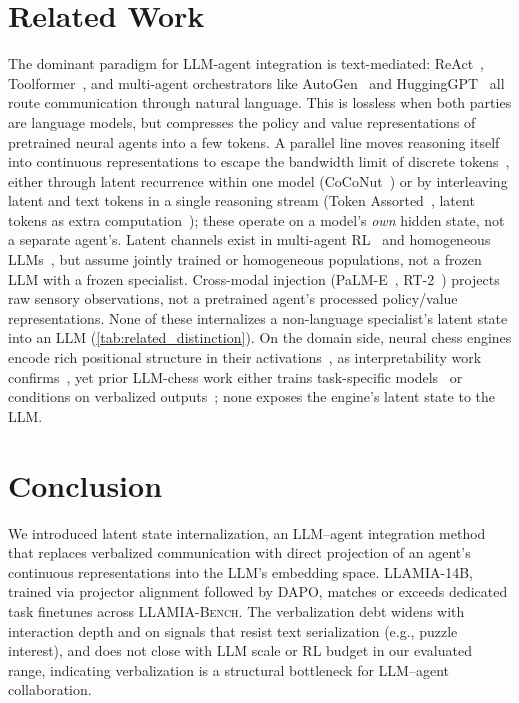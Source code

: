\section{Related Work}
\vspace{-2mm}
The dominant paradigm for LLM-agent integration is text-mediated: ReAct~\cite{yao2022react}, Toolformer~\cite{schick2023toolformerlanguagemodelsteach}, and multi-agent orchestrators like AutoGen~\cite{wu2023autogen} and HuggingGPT~\cite{shen2024hugginggpt} all route communication through natural language. This is lossless when both parties are language models, but compresses the policy and value representations of pretrained neural agents into a few tokens. A parallel line moves reasoning itself into continuous representations to escape the bandwidth limit of discrete tokens~\cite{zhu2025surveylatentreasoning}, either through latent recurrence within one model (CoCoNut~\cite{hao2025traininglargelanguagemodels}) or by interleaving latent and text tokens in a single reasoning stream (Token Assorted~\cite{su2025tokenassorted}, latent tokens as extra computation~\cite{sun2025latenttokens}); these operate on a model's \emph{own} hidden state, not a separate agent's. Latent channels exist in multi-agent RL~\cite{sukhbaatar2016learningmultiagentcommunicationbackpropagation,das2019tarmac,foerster2016learning} and homogeneous LLMs~\cite{latentmas2025}, but assume jointly trained or homogeneous populations, not a frozen LLM with a frozen specialist. Cross-modal injection (PaLM-E~\cite{driess2023palmeembodiedmultimodallanguage}, RT-2~\cite{brohan2023rt2visionlanguageactionmodelstransfer}) projects raw sensory observations, not a pretrained agent's processed policy/value representations. None of these internalizes a non-language specialist's latent state into an LLM (\cref{tab:related_distinction}). On the domain side, neural chess engines encode rich positional structure in their activations~\cite{silver2017mastering,monroe2024mastering}, as interpretability work confirms~\cite{jenner2024evidence}, yet prior LLM-chess work either trains task-specific models~\cite{jhamtani-etal-2018-learning} or conditions on verbalized outputs~\cite{feng2024chessgpt}; none exposes the engine's latent state to the LLM.

\vspace{-3mm}
\section{Conclusion}
\label{sec:conclusion}
\vspace{-3mm}
We introduced latent state internalization, an LLM--agent integration method that
replaces verbalized communication with direct projection of an agent's continuous
representations into the LLM's embedding space. LLAMIA-14B, trained via
projector alignment followed by DAPO, matches or exceeds dedicated task finetunes across
\textsc{LLAMIA-Bench}. The verbalization debt widens with interaction depth and on
signals that resist text serialization (e.g., puzzle interest), and does not close with LLM scale or RL budget in
our evaluated range, indicating verbalization is a structural bottleneck for LLM--agent
collaboration.

